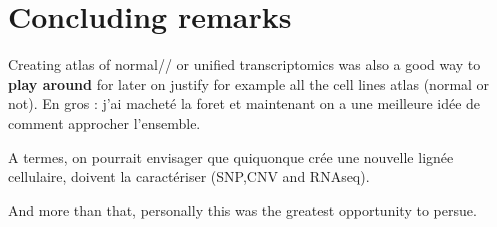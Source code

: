 \clearpage
\chapter{Concluding remarks}
\label{ch:conclusion}



Creating atlas of normal// or unified transcriptomics was also a good way to
\textbf{play around} for later on justify for example all the cell lines atlas
(normal or not). En gros : j'ai macheté la foret et maintenant on a une meilleure
idée de comment approcher  l'ensemble.

A termes, on pourrait envisager que quiquonque crée une nouvelle lignée cellulaire,
doivent la caractériser (SNP,CNV and RNAseq).


And more than that, personally this was the greatest opportunity to persue.

